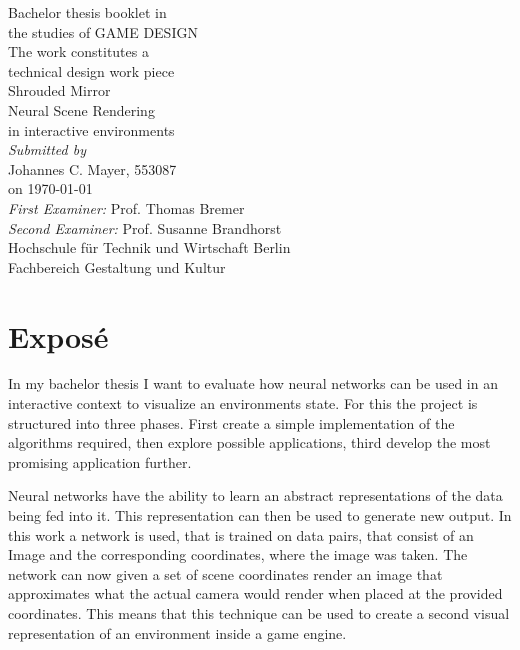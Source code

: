 \documentclass[a4paper, twoside, 10pt]{report}
\begin{document}
\begin{flushleft}
\begin{spacing}{1.5}
{\Large
Bachelor thesis booklet in \\ the studies of GAME DESIGN \\
\vspace*{\fill}
The work constitutes a \\ technical design work piece \\
\vspace*{\fill}
{\Huge Shrouded Mirror} \\
Neural Scene Rendering \\ in interactive environments \\
\vspace*{\fill}
\textit{Submitted by} \\
Johannes C. Mayer, 553087 \\
on \today \\
\vspace*{\fill}
\textit{First Examiner:} Prof. Thomas Bremer \\
\textit{Second Examiner:} Prof. Susanne Brandhorst \\
\vspace*{\fill}
Hochschule f\"ur Technik und Wirtschaft Berlin \\
Fachbereich Gestaltung und Kultur \\
}
\end{spacing}
\end{flushleft}

\chapter*{Expos\'e}
In my bachelor thesis I want to evaluate how neural networks can be used in an interactive context to visualize an environments state. For this the project is structured into three phases. First create a simple implementation of the algorithms required, then explore possible applications, third develop the most promising application further.

Neural networks have the ability to learn an abstract representations of the data being fed into it. This representation can then be used to generate new output. In this work a network is used, that is trained on data pairs, that consist of an Image and the corresponding coordinates, where the image was taken.  The network can now given a set of scene coordinates render an image that approximates what the actual camera would render when placed at the provided coordinates. This means that this technique can be used to create a second visual representation of an environment inside a game engine. 
\end{document}
